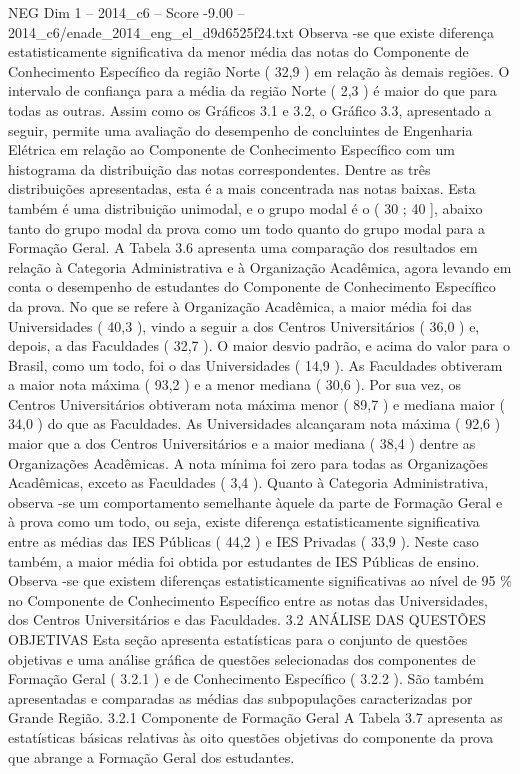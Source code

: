 \begin{textsample}{NEG Dim 1 – 2014\_c6 – Score -9.00 – 2014\_c6/enade\_2014\_eng\_el\_d9d6525f24.txt}
Observa -se que existe diferença estatisticamente significativa da menor média das notas do Componente de Conhecimento Específico da região Norte ( 32,9 ) em relação às demais regiões.
O intervalo de confiança para a média da região Norte ( 2,3 ) é maior do que para todas as outras.
Assim como os Gráficos 3.1 e 3.2, o Gráfico 3.3, apresentado a seguir, permite uma avaliação do desempenho de concluintes de Engenharia Elétrica em relação ao Componente de Conhecimento Específico com um histograma da distribuição das notas correspondentes.
Dentre as três distribuições apresentadas, esta é a mais concentrada nas notas baixas.
Esta também é uma distribuição unimodal, e o grupo modal é o ( 30 ; 40 ], abaixo tanto do grupo modal da prova como um todo quanto do grupo modal para a Formação Geral.
A Tabela 3.6 apresenta uma comparação dos resultados em relação à Categoria Administrativa e à Organização Acadêmica, agora levando em conta o desempenho de estudantes do Componente de Conhecimento Específico da prova.
No que se refere à Organização Acadêmica, a maior média foi das Universidades ( 40,3 ), vindo a seguir a dos Centros Universitários ( 36,0 ) e, depois, a das Faculdades ( 32,7 ).
O maior desvio padrão, e acima do valor para o Brasil, como um todo, foi o das Universidades ( 14,9 ).
As Faculdades obtiveram a maior nota máxima ( 93,2 ) e a menor mediana ( 30,6 ).
Por sua vez, os Centros Universitários obtiveram nota máxima menor ( 89,7 ) e mediana maior ( 34,0 ) do que as Faculdades.
As Universidades alcançaram nota máxima ( 92,6 ) maior que a dos Centros Universitários e a maior mediana ( 38,4 ) dentre as Organizações Acadêmicas.
A nota mínima foi zero para todas as Organizações Acadêmicas, exceto as Faculdades ( 3,4 ).
Quanto à Categoria Administrativa, observa -se um comportamento semelhante àquele da parte de Formação Geral e à prova como um todo, ou seja, existe diferença estatisticamente significativa entre as médias das IES Públicas ( 44,2 ) e IES Privadas ( 33,9 ).
Neste caso também, a maior média foi obtida por estudantes de IES Públicas de ensino.
Observa -se que existem diferenças estatisticamente significativas ao nível de 95 \% no Componente de Conhecimento Específico entre as notas das Universidades, dos Centros Universitários e das Faculdades. 3.2 ANÁLISE DAS QUESTÕES OBJETIVAS Esta seção apresenta estatísticas para o conjunto de questões objetivas e uma análise gráfica de questões selecionadas dos componentes de Formação Geral ( 3.2.1 ) e de Conhecimento Específico ( 3.2.2 ).
São também apresentadas e comparadas as médias das subpopulações caracterizadas por Grande Região. 3.2.1 Componente de Formação Geral A Tabela 3.7 apresenta as estatísticas básicas relativas às oito questões objetivas do componente da prova que abrange a Formação Geral dos estudantes.

\end{textsample}

